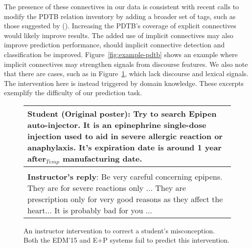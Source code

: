 \documentclass[letterpaper]{article}
\begin{document}
\noindent The presence of these connectives in our data is consistent with recent 
calls \cite{forbesriley2016} to modify the PDTB relation inventory by 
adding a broader set of tags, such as those suggested by \citeauthor{tonelli2010} 
(\citeyear{tonelli2010}). Increasing the PDTB's coverage of explicit connectives 
would likely improve results.
The added use of implicit connectives may also 
improve prediction performance, should 
implicit connective detection and classification be improved. 
Figure~\ref{fig:example-pdtb} shows an example where implicit connectives may 
strengthen signals from discourse features. We also note that there are cases, 
such as in Figure~\ref{fig:example-danger}, which lack discourse and lexical 
signals. The intervention here is instead triggered by domain knowledge. These 
excerpts exemplify the difficulty of our prediction task.\\

\begin{figure}[t]
\small 
\begin{tabular}{|p{7.8cm}|}
\hline 

\textbf{Student (Original poster)}: Try to search Epipen auto-injector. 
It is an epinephrine single-dose injection used to aid in severe 
allergic reaction or anaphylaxis. It's expiration date 
is around 1 year \textbf{after}$_{Temp}$ manufacturing date. \\

\hline \\

\textbf{Instructor's reply}: Be very careful concerning epipens. They are for 
severe reactions only ... They are prescription only for very good reasons as 
they affect the heart... It is probably bad for you ... \\

\hline

\end{tabular}
\caption{An instructor intervention to correct a student's misconception. 
Both the EDM'15 and E+P systems fail to predict this intervention.  
} 
\label{fig:example-danger}
\end{figure}
\end{document}
